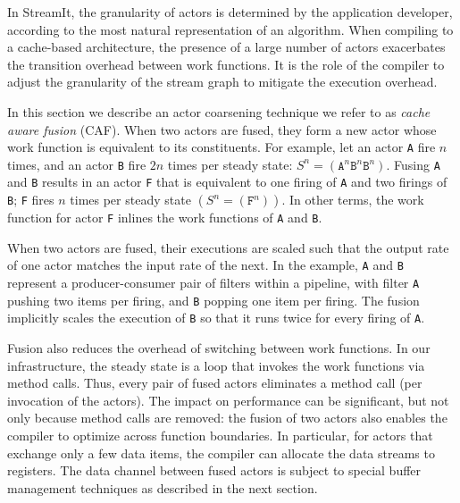 In StreamIt, the granularity of actors is determined by the
application developer, according to 
the most natural representation of an algorithm. When compiling to a
cache-based architecture, the presence of a  large number of actors
exacerbates the transition overhead between work functions.
It is the role of the compiler  to adjust the granularity of
the stream graph to mitigate the execution overhead.

In this section we describe an actor coarsening technique we refer to
as {\it cache aware fusion} (CAF). When two actors are fused, they
form a new actor whose work function is equivalent to its constituents.
For example, let an actor \texttt{A} fire $n$
times, and an actor \texttt{B} fire $2n$ times per steady state:
$S^n=(\texttt{A}^n\texttt{B}^n\texttt{B}^n)$. Fusing \texttt{A} and
\texttt{B} results in an actor \texttt{F} that is equivalent to one 
firing of \texttt{A} and two 
firings of \texttt{B}; \texttt{F} fires $n$ times per steady state
$(S^n=(\texttt{F}^n))$.  In other terms, the work
function for actor \texttt{F} inlines the work functions of
\texttt{A} and \texttt{B}.

When two actors are fused, their executions are scaled such that the output
rate of one actor matches the input rate of the next. In the example,
\texttt{A} and \texttt{B} represent a producer-consumer pair of
filters within a pipeline, with filter \texttt{A}  
pushing two items per firing, and \texttt{B} popping one item per
firing. The fusion implicitly scales the execution of \texttt{B} so
that it runs twice for every firing of \texttt{A}.


Fusion also reduces the overhead of switching between
work functions. In our infrastructure, the steady state is a loop that
invokes the work functions via method calls. Thus, every pair of fused
actors eliminates a method call (per invocation of the actors). The impact on
performance can be significant, but not only because method calls are
removed: the fusion of two actors also enables the compiler to
optimize across function boundaries. In particular, for actors that
exchange only a few data items, the compiler can allocate the data
streams to registers. 
The data channel between fused actors is
subject to special buffer management techniques as described in the
next section.

